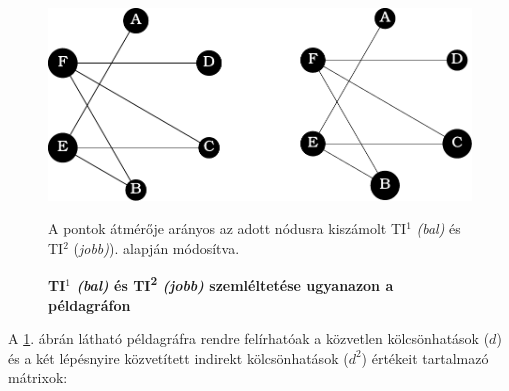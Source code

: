 \documentclass[a4paper,12pt]{article}
\begin{document}
 	 \begin{figure}[H]
 		 \includegraphics[scale=1]{img/graphs.pdf}
 		 \centering
 		 \caption{\textbf{TI$^1$ \textit{(bal)} és TI\textsuperscript{2} \textit{(jobb)} szemléltetése ugyanazon a példagráfon} }
 		 A pontok átmérője arányos az adott nódusra kiszámolt TI$^1$ \textit{(bal)} és TI$^2$ (\textit{jobb)}). \cite{ti} alapján módosítva.
 		 \label{fig:peldagraph}
 	 \end{figure}
 	 
 	 \pagebreak
 	 
 	 A \ref{fig:peldagraph}. ábrán látható példagráfra rendre felírhatóak a közvetlen  kölcsönhatások ($d$) és a két lépésnyire közvetített indirekt kölcsönhatások ($d^2$) értékeit tartalmazó mátrixok:
	
\end{document}
